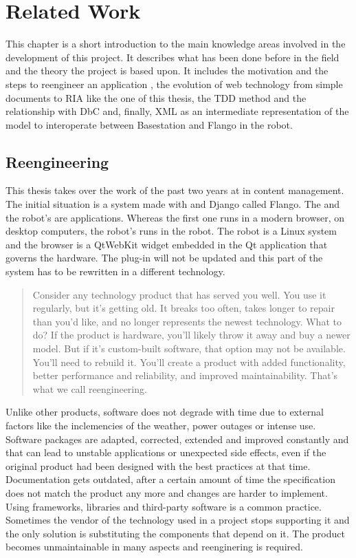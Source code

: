 \chapter{Related Work}
This chapter is a short introduction to the main knowledge areas involved in the development of this project.
It describes what has been done before in the field and the theory the project is based upon.
It includes the motivation and the steps to reengineer an application , the evolution of web technology from simple documents to \ac{RIA} like the one of this thesis, the \ac{TDD} method and the relationship with \ac{DbC} and, finally, \ac{XML} as an intermediate representation of the model to interoperate between Basestation and Flango \cm in the robot.

\section{Reengineering}
\label{sec:reengineering}
This thesis takes over the work of the past two years at \company in content management.
The initial situation is a system made with \flash and Django called Flango.
The \se and the robot's \cm are \flash applications.
Whereas the first one runs in a modern browser, on desktop computers, the robot's \cm runs in the robot.
The robot is a Linux system and the browser is a QtWebKit widget embedded in the Qt application that governs the hardware.
The \flash plug-in will not be updated and this part of the system has to be rewritten in a different technology.

\begin{quote} 
Consider any technology product that has served you well. 
You use it regularly, but it's getting old. 
It breaks too often, takes longer to repair than you'd like, and no longer represents the newest technology.
What to do? If the product is hardware, you'll likely throw it away and buy a newer model.
But if it's custom-built software, that option may not be available. 
You'll need to rebuild it. 
You'll create a product with added functionality, better performance and reliability, and improved maintainability.
That's what we call reengineering. \cite{Pressman:2007}
\end{quote}

Unlike other products, software does not degrade with time due to external factors like the inclemencies of the weather, power outages or intense use.
Software packages are adapted, corrected, extended and improved constantly and that can lead to unstable applications or unexpected side effects, even if the original product had been designed with the best practices at that time.
Documentation gets outdated, after a certain amount of time the specification does not match the product any more and changes are harder to implement. %
Using frameworks, libraries and third-party software is a common practice. 
Sometimes the vendor of the technology used in a project stops supporting it and the only solution is substituting the components that depend on it. 
The product becomes unmaintainable in many aspects and reenginering is required. 

